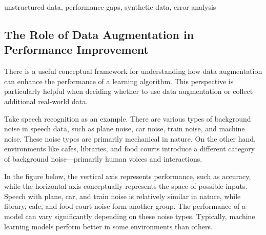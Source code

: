 \documentclass[12pt,openany]{book}
\begin{document}
\begin{keywordsbox}
unstructured data, performance gaps, synthetic data, error analysis
\end{keywordsbox}

\subsection{The Role of Data Augmentation in Performance Improvement}

There is a useful conceptual framework for understanding how data augmentation can enhance the performance of a learning algorithm. This perspective is particularly helpful when deciding whether to use data augmentation or collect additional real-world data. 
\newline

Take speech recognition as an example. There are various types of background noise in speech data, such as plane noise, car noise, train noise, and machine noise. These noise types are primarily mechanical in nature. On the other hand, environments like cafes, libraries, and food courts introduce a different category of background noise—primarily human voices and interactions. 
\newline

In the figure below, the vertical axis represents performance, such as accuracy, while the horizontal axis conceptually represents the space of possible inputs. Speech with plane, car, and train noise is relatively similar in nature, while library, cafe, and food court noise form another group. The performance of a model can vary significantly depending on these noise types. Typically, machine learning models perform better in some environments than others. 
\newline
\end{document}
